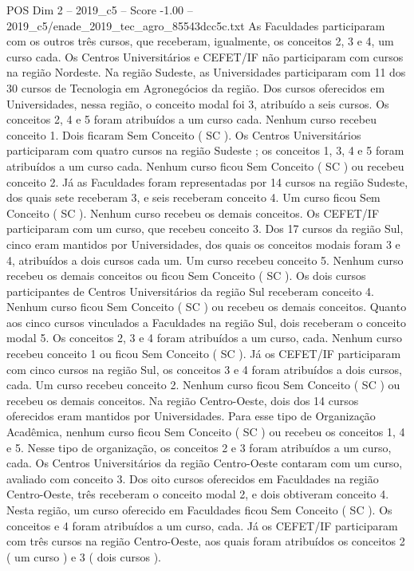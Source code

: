 \begin{textsample}{POS Dim 2 – 2019\_c5 – Score -1.00 – 2019\_c5/enade\_2019\_tec\_agro\_85543dcc5c.txt}
As Faculdades participaram com os outros três cursos, que receberam, igualmente, os conceitos 2, 3 e 4, um curso cada.
Os Centros Universitários e CEFET/IF não participaram com cursos na região Nordeste.
Na região Sudeste, as Universidades participaram com 11 dos 30 cursos de Tecnologia em Agronegócios da região.
Dos cursos oferecidos em Universidades, nessa região, o conceito modal foi 3, atribuído a seis cursos.
Os conceitos 2, 4 e 5 foram atribuídos a um curso cada.
Nenhum curso recebeu conceito 1.
Dois ficaram Sem Conceito ( SC ).
Os Centros Universitários participaram com quatro cursos na região Sudeste ; os conceitos 1, 3, 4 e 5 foram atribuídos a um curso cada.
Nenhum curso ficou Sem Conceito ( SC ) ou recebeu conceito 2.
Já as Faculdades foram representadas por 14 cursos na região Sudeste, dos quais sete receberam 3, e seis receberam conceito 4.
Um curso ficou Sem Conceito ( SC ).
Nenhum curso recebeu os demais conceitos.
Os CEFET/IF participaram com um curso, que recebeu conceito 3.
Dos 17 cursos da região Sul, cinco eram mantidos por Universidades, dos quais os conceitos modais foram 3 e 4, atribuídos a dois cursos cada um.
Um curso recebeu conceito 5.
Nenhum curso recebeu os demais conceitos ou ficou Sem Conceito ( SC ).
Os dois cursos participantes de Centros Universitários da região Sul receberam conceito 4.
Nenhum curso ficou Sem Conceito ( SC ) ou recebeu os demais conceitos.
Quanto aos cinco cursos vinculados a Faculdades na região Sul, dois receberam o conceito modal 5.
Os conceitos 2, 3 e 4 foram atribuídos a um curso, cada.
Nenhum curso recebeu conceito 1 ou ficou Sem Conceito ( SC ).
Já os CEFET/IF participaram com cinco cursos na região Sul, os conceitos 3 e 4 foram atribuídos a dois cursos, cada.
Um curso recebeu conceito 2.
Nenhum curso ficou Sem Conceito ( SC ) ou recebeu os demais conceitos.
Na região Centro-Oeste, dois dos 14 cursos oferecidos eram mantidos por Universidades.
Para esse tipo de Organização Acadêmica, nenhum curso ficou Sem Conceito ( SC ) ou recebeu os conceitos 1, 4 e 5.
Nesse tipo de organização, os conceitos 2 e 3 foram atribuídos a um curso, cada.
Os Centros Universitários da região Centro-Oeste contaram com um curso, avaliado com conceito 3.
Dos oito cursos oferecidos em Faculdades na região Centro-Oeste, três receberam o conceito modal 2, e dois obtiveram conceito 4.
Nesta região, um curso oferecido em Faculdades ficou Sem Conceito ( SC ).
Os conceitos e 4 foram atribuídos a um curso, cada.
Já os CEFET/IF participaram com três cursos na região Centro-Oeste, aos quais foram atribuídos os conceitos 2 ( um curso ) e 3 ( dois cursos ).

\end{textsample}
